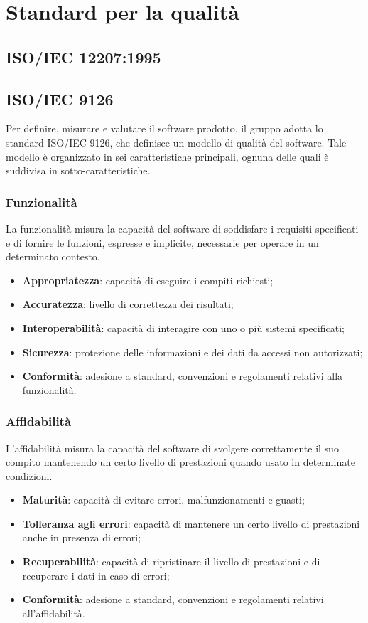 \section{Standard per la qualità}

\subsection{ISO/IEC 12207:1995}

\subsection{ISO/IEC 9126}
Per definire, misurare e valutare il software prodotto, il gruppo adotta lo 
standard ISO/IEC 9126, che definisce un modello di qualità del software. Tale 
modello è organizzato in sei caratteristiche principali, 
ognuna delle quali è suddivisa in sotto-caratteristiche.

\subsubsection{Funzionalità}
La funzionalità misura la capacità del software di soddisfare i requisiti specificati e di fornire le funzioni,
espresse e implicite, necessarie per operare in un determinato contesto.
\begin{itemize}
    \item \textbf{Appropriatezza}: capacità di eseguire i compiti richiesti;
    \item \textbf{Accuratezza}: livello di correttezza dei risultati;
    \item \textbf{Interoperabilità}: capacità di interagire con uno o più sistemi specificati;
    \item \textbf{Sicurezza}: protezione delle informazioni e dei dati da accessi non autorizzati;
    \item \textbf{Conformità}: adesione a standard, convenzioni e regolamenti relativi alla funzionalità.
\end{itemize}

\subsubsection{Affidabilità}
L'affidabilità misura la capacità del software di svolgere correttamente il suo compito
mantenendo un certo livello di prestazioni quando usato in determinate condizioni.
\begin{itemize}
    \item \textbf{Maturità}: capacità di evitare errori, malfunzionamenti e guasti;
    \item \textbf{Tolleranza agli errori}: capacità di mantenere un certo livello di prestazioni anche in presenza di errori;
    \item \textbf{Recuperabilità}: capacità di ripristinare il livello di prestazioni e di recuperare
        i dati in caso di errori;
    \item \textbf{Conformità}: adesione a standard, convenzioni e regolamenti relativi all'affidabilità.
\end{itemize}

